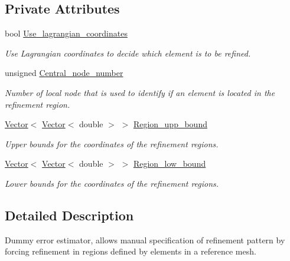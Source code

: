 \subsection*{Private Attributes}
\begin{DoxyCompactItemize}
\item 
bool \hyperlink{classoomph_1_1DummyErrorEstimator_a052e3d319921a682b7fa0fef66496625}{Use\+\_\+lagrangian\+\_\+coordinates}
\begin{DoxyCompactList}\small\item\em Use Lagrangian coordinates to decide which element is to be refined. \end{DoxyCompactList}\item 
unsigned \hyperlink{classoomph_1_1DummyErrorEstimator_a9885e1d7966047816f1a24448d5f6ac5}{Central\+\_\+node\+\_\+number}
\begin{DoxyCompactList}\small\item\em Number of local node that is used to identify if an element is located in the refinement region. \end{DoxyCompactList}\item 
\hyperlink{classoomph_1_1Vector}{Vector}$<$ \hyperlink{classoomph_1_1Vector}{Vector}$<$ double $>$ $>$ \hyperlink{classoomph_1_1DummyErrorEstimator_a80f495a70922a1e458899e2e7313620d}{Region\+\_\+upp\+\_\+bound}
\begin{DoxyCompactList}\small\item\em Upper bounds for the coordinates of the refinement regions. \end{DoxyCompactList}\item 
\hyperlink{classoomph_1_1Vector}{Vector}$<$ \hyperlink{classoomph_1_1Vector}{Vector}$<$ double $>$ $>$ \hyperlink{classoomph_1_1DummyErrorEstimator_a181a66a833352440c325a8edbefb51cf}{Region\+\_\+low\+\_\+bound}
\begin{DoxyCompactList}\small\item\em Lower bounds for the coordinates of the refinement regions. \end{DoxyCompactList}\end{DoxyCompactItemize}


\subsection{Detailed Description}
Dummy error estimator, allows manual specification of refinement pattern by forcing refinement in regions defined by elements in a reference mesh. 

